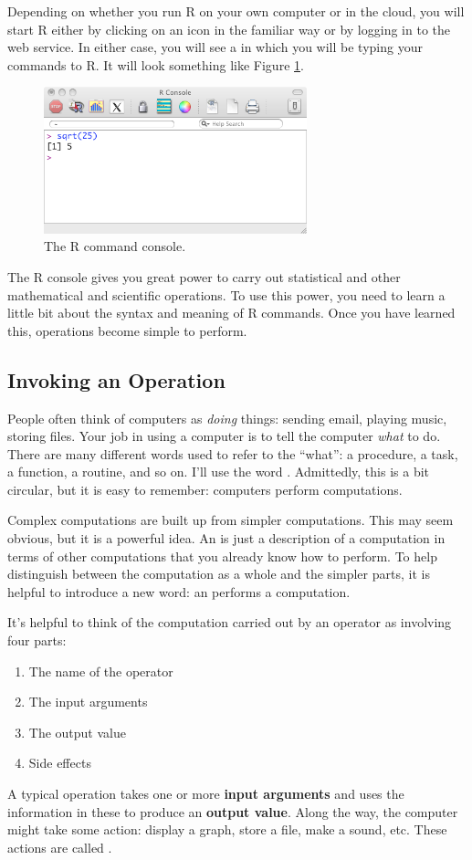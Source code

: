 Depending on whether you run R on your own computer or in the cloud,
you will start R either by clicking on an icon in the familiar way or
by logging in to the web service.  In either case, you will see a
 in which you will be typing your commands to
R.  It will look something like Figure \ref{fig:console-picture}.


\begin{figure}
\centerline{\includegraphics[width=3in]{console-picture-2011.png}}
\caption{\label{fig:console-picture} \sf The R command console.}
\end{figure}

The R console gives you great power to carry out statistical and other
mathematical and scientific operations.  To use this power, you need
to learn a little bit about the syntax and meaning of R commands.
Once you have learned this, operations become simple to perform.

\subsection{Invoking an Operation}

People often think of computers as {\em doing} things: sending email,
playing music, storing files.  Your job in using a computer is to tell
the computer {\em what} to do.  There are many different words used 
to refer to the ``what'': a procedure, a task, a function, a routine,
and so on.  I'll use the word .  Admittedly, this
is a bit circular, but it is easy to remember: computers perform computations.

Complex computations are built up from simpler computations.  This may seem obvious, but it is a powerful idea.  An  is just a description of a 
computation in terms of other computations that you already know how to perform.  To help distinguish between the computation as a whole and the simpler parts, it is helpful to introduce a new word: an  performs a computation.

It's helpful to think of the computation carried out by an operator 
as involving four parts:
\begin{enumerate}
\item The name of the operator
\item The input arguments
\item The output value
\item Side effects
\end{enumerate}
A typical operation takes one or more {\bf input arguments} and uses the
information in these to produce an {\bf output value}.  Along the way, the
computer might take some action: display a graph,
store a file, make a sound, etc.  These actions are called
.  

